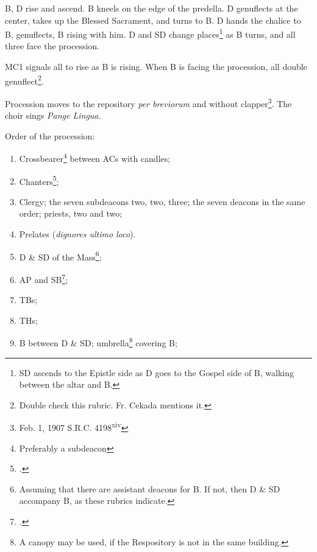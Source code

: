 {\rubric B, D rise and ascend. B kneels on the edge of the predella. D
genuflects at the center, takes up the Blessed Sacrament, and turns to B. D
hands the chalice to B, genuflects, B rising with him. D and SD change
places\footnote{SD ascends to the Epistle side as D goes to the Gospel side of
B, walking between the altar and B.} as B turns, and all three face the
procession.

\rubric MC1 signals all to rise as B is rising. When B is facing the
procession, all double genuflect\footnote{Double check this rubric. Fr. Cekada
mentions it.}.

\rubric Procession moves to the repository \textit{per breviorum} and without
clapper\footnote{Feb. 1, 1907 S.R.C. 4198\textsuperscript{xiv}}. The choir
sings \textit{Pange Lingua.}

\rubric Order of the procession:

\begin{enumerate}
    
    \item Crossbearer\footnote{Preferably a subdeacon} between ACs with
        candles;

    \item Chanters\footcite[``If they are clerics; if not they precede the
        cross-bearer''.][p. 191]{stehle};

    \item Clergy; the seven subdeacons two, two, three; the seven deacons in
        the same order; priests, two and two;

    \item Prelates (\textit{dignores ultimo loco}).

    \item D \& SD of the Mass\footnote{Assuming that there are assistant
        deacons for B. If not, then D \& SD accompany B, as these rubrics
        indicate.};

    \item AP and SB\footcite[``If the width of the aisle permits, the assistant
        priest may walk at the right of the bishop, slighlty in advance of the
        assistant deacon, and the staff-bearer may walk between the
        thurifers.''][footnote 2]{stehle};

    \item TBs;

    \item THs;

    \item B between D \& SD; umbrella\footnote{A canopy may be used, if the
        Respository is not in the same building.} covering B;


\end{enumerate}}

